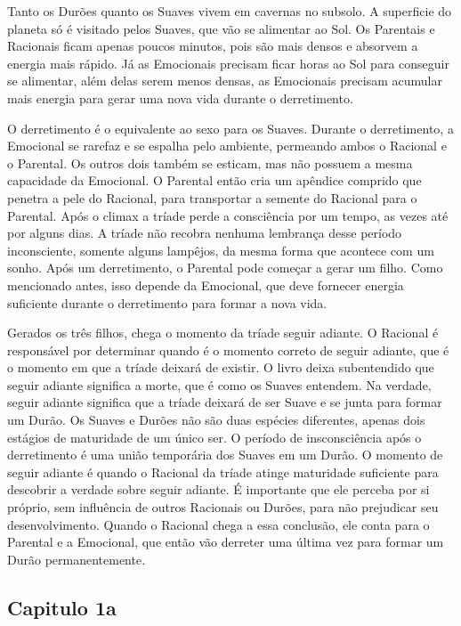 \documentclass[14pt,portuguese]{extreport}
\begin{document}
      Tanto os Durões quanto os Suaves vivem em cavernas no subsolo. A superficie do planeta só é visitado pelos Suaves, que vão se alimentar ao Sol. Os Parentais
      e Racionais ficam apenas poucos minutos, pois são mais densos e absorvem a energia mais rápido. Já as Emocionais precisam ficar horas ao Sol para conseguir
      se alimentar, além delas serem menos densas, as Emocionais precisam acumular mais energia para gerar uma nova vida durante o derretimento.
      
      O derretimento é o equivalente ao sexo para os Suaves. Durante o derretimento, a Emocional se rarefaz e se espalha pelo ambiente, permeando ambos o Racional e o Parental.
      Os outros dois também se esticam, mas não possuem a mesma capacidade da Emocional. O Parental então cria um apêndice comprido que penetra a pele do Racional, para transportar
      a semente do Racional para o Parental. Após o climax a tríade perde a consciência por um tempo, as vezes até por alguns dias. A tríade não recobra nenhuma lembrança desse período
      inconsciente, somente alguns lampêjos, da mesma forma que acontece com um sonho. Após um derretimento, o Parental pode começar a gerar um filho. 
      Como mencionado antes, isso depende da Emocional, que deve fornecer energia suficiente durante o derretimento para formar a nova vida. 
      
      Gerados os três filhos, chega o momento da tríade seguir adiante. O Racional é responsável por determinar quando é o momento correto de seguir adiante, que é
      o momento em que a tríade deixará de existir. O livro deixa subentendido que seguir adiante significa a morte, que é como os Suaves entendem. Na verdade, seguir adiante significa 
      que a tríade deixará de ser Suave e se junta para formar um Durão. Os Suaves e Durões não são duas espécies diferentes, apenas dois estágios de maturidade de um único ser. 
      O período de insconsciência após o derretimento é uma união temporária dos Suaves em um Durão. O momento de seguir adiante é quando o Racional da tríade atinge maturidade suficiente
      para descobrir a verdade sobre seguir adiante. É importante que ele perceba por si próprio, sem influência de outros Racionais ou Durões, para não prejudicar seu desenvolvimento. 
      Quando o Racional chega a essa conclusão, ele conta para o Parental e a Emocional, que então vão derreter uma última vez para formar um Durão permanentemente.

      \subsection{Capitulo 1a}
      
\end{document}

